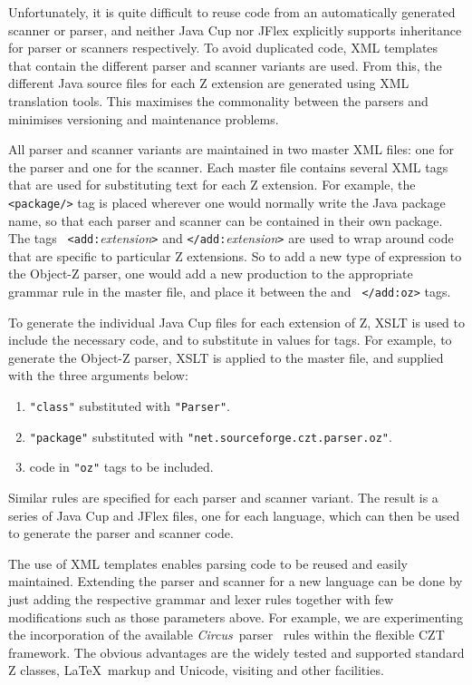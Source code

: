 \documentclass{llncs}
\newcommand{\Circus}{{\sf\slshape Circus}}
\begin{document}
  Unfortunately, it is quite difficult to reuse code from an
  automatically generated scanner or parser, and neither Java Cup nor
  JFlex explicitly supports inheritance for parser or scanners
  respectively.  To avoid duplicated code, XML templates that contain
  the different parser and scanner variants are used. From this, the
  different Java source files for each Z extension are generated using
  XML translation tools.  This maximises the commonality between the
  parsers and minimises versioning and maintenance problems.

All parser and scanner variants are maintained in two master XML
files: one for the parser and one for the scanner. Each master file
contains several XML tags that are used for substituting text for each
Z extension. For example, the {\tt <package/>} tag is placed wherever
one would normally write the Java package name, so that each parser
and scanner can be contained in their own package. The tags {\tt
<add:}{\em extension}{\tt >} and {\tt </add:}{\em extension}{\tt >}
are used to wrap around code that are specific to particular Z
extensions. So to add a new type of expression to the Object-Z parser,
one would add a new production to the appropriate grammar rule in the
master file, and place it between the {\tt <add:oz>} and {\tt
</add:oz>} tags.

To generate the individual Java Cup files for each extension of Z,
XSLT is used to include the necessary code, and to substitute in
values for tags. For example, to generate the Object-Z parser, XSLT is
applied to the master file, and supplied with the three arguments
below:
\begin{enumerate}
  \item {\tt "class"} substituted with {\tt "Parser"}.
  \item {\tt "package"} substituted with {\tt "net.sourceforge.czt.parser.oz"}.
  \item code in {\tt "oz"} tags to be included.
\end{enumerate}

Similar rules are specified for each parser and scanner variant. The
result is a series of Java Cup and JFlex files, one for each language,
which can then be used to generate the parser and scanner code.

The use of XML templates enables parsing code to be reused and easily
maintained.  Extending the parser and scanner for a new language can
be done by just adding the respective grammar and lexer rules together
with few modifications such as those parameters above.  For example,
we are experimenting the incorporation of the available \Circus\
parser~\cite{circus.other:parser} rules within the flexible CZT
framework. The obvious advantages are the widely tested and supported
standard Z classes, \LaTeX\ markup and Unicode, visiting and other
facilities.
\end{document}
